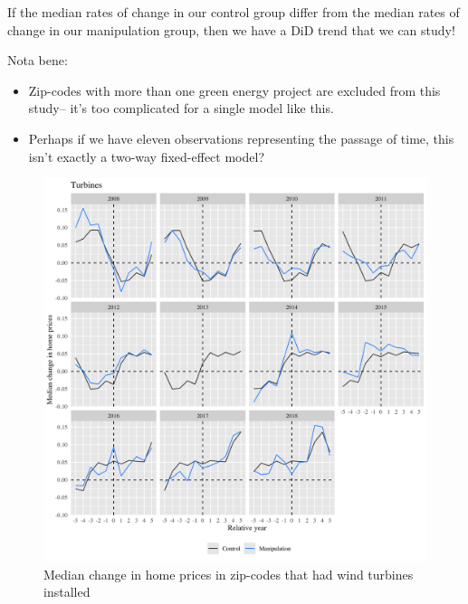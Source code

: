 \documentclass{article}
\begin{document}
If the median rates of change in our control group differ from the median rates of change in our manipulation group, then we have a DiD trend that we can study!

Nota bene:
\begin{itemize}
\item Zip-codes with more than one green energy project are excluded from this study-- it's too complicated for a single model like this.
\item Perhaps if we have eleven observations representing the passage of time, this isn't exactly a two-way fixed-effect model?
\end{itemize}

\begin{figure}[h]
\centering
\includegraphics[width=0.9\linewidth]
{study1_turbine_facets.png} 
\caption{Median change in home prices in zip-codes that had wind turbines installed}
\label{study1turbinefacets}
\end{figure}
\end{document}
